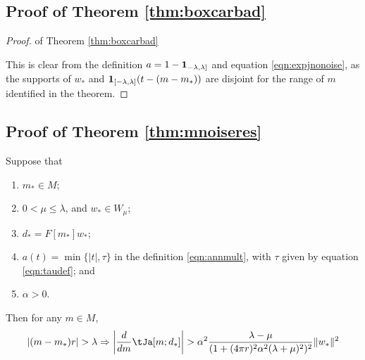 \subsection{Proof of Theorem \ref{thm:boxcarbad}}


\begin{proof} of Theorem \ref{thm:boxcarbad}
  
 This is clear from the definition $a = 1-{\bf 1}_{-\lambda,\lambda]}$ and equation \ref{eqn:expjnonoise}, as the supports of $w_*$ and ${\bf
    1}_{[-\lambda,\lambda]}(t-(m-m_*))$ are disjoint for the range of
  $m$ identified in the theorem.
\end{proof}

\subsection{Proof of Theorem \ref{thm:mnoiseres}}
\begin{proposition}
  \label{thm:rampgood}
  Suppose that
  \begin{enumerate}
  \item $m_* \in M$;
  \item $0 < \mu \le \lambda$, and $w_* \in W_{\mu}$;
  \item $d_* = F[m_*]w_*$;
  \item $a(t)=\min\{|t|,\tau\}$ in the definition \ref{eqn:annmult},
    with $\tau$ given by equation \ref{eqn:taudef}; and
  \item $\alpha > 0$.
  \end{enumerate}
  Then for any $m \in M$, 
  \begin{equation}
    | (m - m_*)r| > \lambda  \Rightarrow  \left|\frac{d}{dm}\tJa[m;d_*]\right| > \alpha^2 
    \frac{\lambda-\mu}{(1+(4\pi r)^2\alpha^2 
      (\lambda+\mu)^2)^{2}} \|w_*\|^2 
    \label{eqn:gradbndnonoise}
  \end{equation}
\end{proposition}

